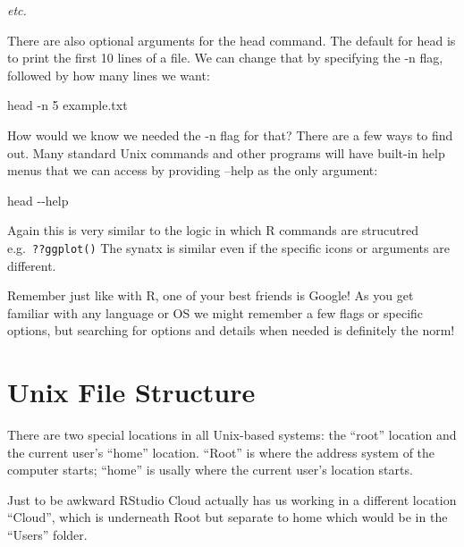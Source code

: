\documentclass[
]{book}
\newenvironment{Shaded}{\begin{snugshade}}{\end{snugshade}}
\newcommand{\AttributeTok}[1]{\textcolor[rgb]{0.77,0.63,0.00}{#1}}
\newcommand{\FunctionTok}[1]{\textcolor[rgb]{0.00,0.00,0.00}{#1}}
\newcommand{\NormalTok}[1]{#1}
\begin{document}
\emph{etc.}

There are also optional arguments for the head command. The default for head is to print the first 10 lines of a file. We can change that by specifying the -n flag, followed by how many lines we want:

\begin{Shaded}
\begin{Highlighting}[]
    \FunctionTok{head} \AttributeTok{{-}n}\NormalTok{ 5 example.txt}
\end{Highlighting}
\end{Shaded}

How would we know we needed the -n flag for that? There are a few ways to find out. Many standard Unix commands and other programs will have built-in help menus that we can access by providing --help as the only argument:

\begin{Shaded}
\begin{Highlighting}[]
    \FunctionTok{head} \AttributeTok{{-}{-}help}
\end{Highlighting}
\end{Shaded}

Again this is very similar to the logic in which R commands are strucutred e.g.~\texttt{??ggplot()} The synatx is similar even if the specific icons or arguments are different.

Remember just like with R, one of your best friends is Google! As you get familiar with any language or OS we might remember a few flags or specific options, but searching for options and details when needed is definitely the norm!

\hypertarget{unix-file-structure}{%
\section{Unix File Structure}\label{unix-file-structure}}

There are two special locations in all Unix-based systems: the ``root'' location and the current user's ``home'' location. ``Root'' is where the address system of the computer starts; ``home'' is usally where the current user's location starts.

Just to be awkward RStudio Cloud actually has us working in a different location ``Cloud'', which is underneath Root but separate to home which would be in the ``Users'' folder.
\end{document}
